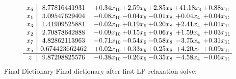 \documentclass[8pt]{article}
\begin{document}
 \[\begin{array}{c| c c@{\hskip 2pt} c@{\hskip 2pt} c@{\hskip 2pt} c@{\hskip 2pt} c@{\hskip 2pt} }
 x_{6}   &  8.77816441931 & +  0.34 x_{10} & +  2.59 x_{9} & +  2.85 x_{8} & + 41.18 x_{4} & +  0.88 x_{11}\\
 x_{1}   &  3.09547629404 & -0.08 x_{10} & -0.04 x_{9} & -0.01 x_{8} & +  0.04 x_{4} & +  0.04 x_{11}\\
 x_{3}   &  1.41909525881 & -0.02 x_{10} & +  0.19 x_{9} & +  0.20 x_{8} & +  2.41 x_{4} & +  0.01 x_{11}\\
 x_{2}   &  2.70878642888 & -0.09 x_{10} & +  0.15 x_{9} & +  0.06 x_{8} & +  1.59 x_{4} & +  0.03 x_{11}\\
 x_{7}   &  4.82862113963 & -0.71 x_{10} & -0.54 x_{9} & -0.58 x_{8} & -3.75 x_{4} & +  0.31 x_{11}\\
 x_{5}   &  0.674423662462 & +  0.02 x_{10} & +  0.33 x_{9} & +  0.25 x_{8} & +  4.20 x_{4} & +  0.09 x_{11}\\
\hline
z    &  9.87298825576 & -0.38 x_{10} & -0.26 x_{9} & -0.35 x_{8} & -4.58 x_{4} & -0.06 x_{11}\\
\end{array}\]
Final Dictionary
Final dictionary after first LP relaxation solve: 
\end{document}
